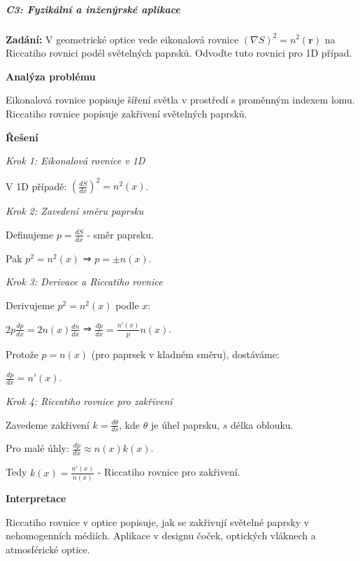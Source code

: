\subparagraph*{C3: Fyzikální a inženýrské aplikace}
\label{subpar:c3-fyzikalni-aplikace}

\begin{example}
\label{ex:c3-lehky-optika}

\noindent\textbf{Zadání:} V geometrické optice vede eikonalová rovnice $(\nabla S)^2 = n^2(\mathbf{r})$ na Riccatiho rovnici podél světelných paprsků. Odvoďte tuto rovnici pro 1D případ.

\vspace{1.5\baselineskip}

\noindent\textbf{Analýza problému}

\noindent Eikonalová rovnice popisuje šíření světla v prostředí s proměnným indexem lomu. Riccatiho rovnice popisuje zakřivení světelných paprsků.

\vspace{1.5\baselineskip}

\noindent\textbf{Řešení}

\noindent\textit{Krok 1: Eikonalová rovnice v 1D}

V 1D případě: $\left(\frac{dS}{dx}\right)^2 = n^2(x)$.

\noindent\textit{Krok 2: Zavedení směru paprsku}

Definujeme $p = \frac{dS}{dx}$ - směr paprsku.

Pak $p^2 = n^2(x)$ ⇒ $p = \pm n(x)$.

\noindent\textit{Krok 3: Derivace a Riccatiho rovnice}

Derivujeme $p^2 = n^2(x)$ podle $x$:

$2p\frac{dp}{dx} = 2n(x)\frac{dn}{dx}$ ⇒ $\frac{dp}{dx} = \frac{n'(x)}{p}n(x)$.

Protože $p = n(x)$ (pro paprsek v kladném směru), dostáváme:

$\frac{dp}{dx} = n'(x)$.

\noindent\textit{Krok 4: Riccatiho rovnice pro zakřivení}

Zavedeme zakřivení $k = \frac{d\theta}{ds}$, kde $\theta$ je úhel paprsku, $s$ délka oblouku.

Pro malé úhly: $\frac{dp}{dx} \approx n(x)k(x)$.

Tedy $k(x) = \frac{n'(x)}{n(x)}$ - Riccatiho rovnice pro zakřivení.

\vspace{1.5\baselineskip}

\noindent\textbf{Interpretace}

Riccatiho rovnice v optice popisuje, jak se zakřivují světelné paprsky v nehomogenních 
médiích. Aplikace v designu čoček, optických vláknech a atmosférické optice.

\end{example}

